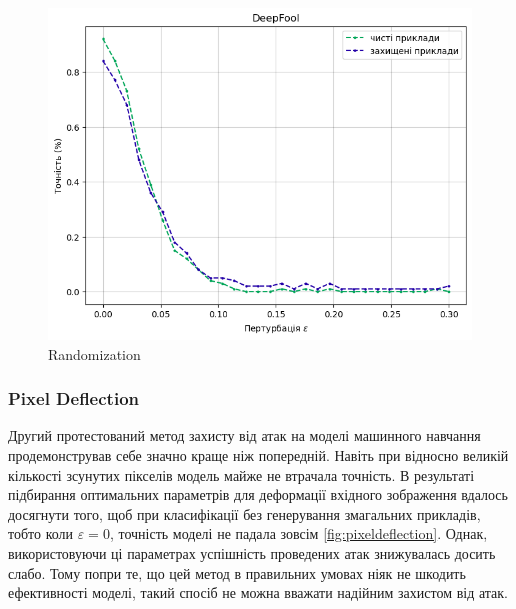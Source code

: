 \documentclass[a4paper,14pt]{extreport}
\begin{document}
\begin{figure}[!htb]
		\endminipage
		\includegraphics[width=1\textwidth]{resources/deepfool_rand_defence.png}
		\endminipage\hfill
		\caption{Randomization}
		\label{fig:randomization}
	\end{figure}

	\subsubsection{Pixel Deflection}
	\noindent
	Другий протестований метод захисту від атак на моделі машинного навчання продемонстрував себе значно краще ніж попередній. Навіть при відносно великій кількості зсунутих пікселів модель майже не втрачала точність. В результаті підбирання оптимальних параметрів для деформації вхідного зображення вдалось досягнути того, щоб при класифікації без генерування змагальних прикладів, тобто коли $\varepsilon=0$, точність моделі не падала зовсім \ref{fig:pixeldeflection}. Однак, використовуючи ці параметрах успішність проведених атак знижувалась досить слабо. Тому попри те, що цей метод в правильних умовах ніяк не шкодить ефективності моделі, такий спосіб не можна вважати надійним захистом від атак.
	
\end{document}

